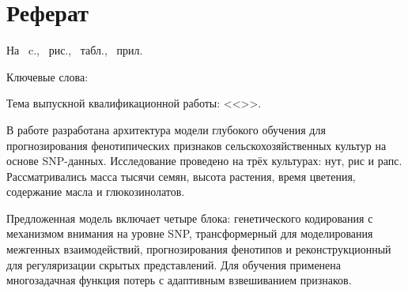 \chapter*[Count-me]{Реферат} %
\thispagestyle{empty}%
%
%




На ~c.,  
~{рис.},
~{табл.},
~{прил.}%



{Ключевые слова: \keywordsRu} %

Тема выпускной квалификационной работы: <<\thesisTitle>>. %


В работе разработана архитектура модели глубокого обучения для прогнозирования 
фенотипических признаков сельскохозяйственных культур на основе SNP-данных. 
Исследование проведено на трёх культурах: нут, рис и рапс. Рассматривались 
масса тысячи семян, высота растения, время цветения, содержание масла и 
глюкозинолатов.

Предложенная модель включает четыре блока: генетического кодирования 
с механизмом внимания на уровне SNP, трансформерный для моделирования 
межгенных взаимодействий, прогнозирования фенотипов и реконструкционный 
для регуляризации скрытых представлений. Для обучения применена многозадачная 
функция потерь с адаптивным взвешиванием признаков.

